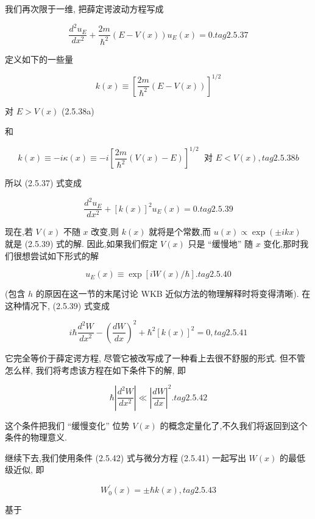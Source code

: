 \documentclass[lang=cn,newtx,10pt,scheme=chinese,thmcnt=section]{elegantbook}
\begin{document}
我们再次限于一维, 把薛定谔波动方程写成

$$
\frac{{d}^{2}{u}_{E}}{d{x}^{2}} + \frac{2m}{{\hbar }^{2}}\left( {E - V\left( x\right) }\right) {u}_{E}\left( x\right) = 0. tag{2.5.37}
$$

定义如下的一些量

$$
k\left( x\right) \equiv {\left\lbrack \frac{2m}{{\hbar }^{2}}\left( E - V\left( x\right) \right) \right\rbrack }^{1/2}
$$

对 $E > V\left( x\right)$ (2.5.38a)

和

$$
k\left( x\right) \equiv - {i\kappa }\left( x\right) \equiv - i{\left\lbrack \frac{2m}{{\hbar }^{2}}\left( V\left( x\right) - E\right) \right\rbrack }^{1/2}\;\text{ 对 }E < V\left( x\right) , tag{2. 5.38b}
$$

所以 (2.5.37) 式变成

$$
\frac{{d}^{2}{u}_{E}}{d{x}^{2}} + {\left\lbrack k\left( x\right) \right\rbrack }^{2}{u}_{E}\left( x\right) = 0. tag{2.5.39}
$$

现在,若 $V\left( x\right)$ 不随 $x$ 改变,则 $k\left( x\right)$ 就将是个常数,而 $u\left( x\right) \propto \exp \left( {\pm {ikx}}\right)$ 就是 (2.5.39) 式的解. 因此,如果我们假定 $V\left( x\right)$ 只是 “缓慢地” 随 $x$ 变化,那时我们很想尝试如下形式的解

$$
{u}_{E}\left( x\right) \equiv \exp \left\lbrack {{iW}\left( x\right) /\hbar }\right\rbrack . tag{2.5.40}
$$

(包含 $h$ 的原因在这一节的末尾讨论 WKB 近似方法的物理解释时将变得清晰). 在这种情况下, (2.5.39) 式变成

$$
i\hbar \frac{{d}^{2}W}{d{x}^{2}} - {\left( \frac{dW}{dx}\right) }^{2} + {\hbar }^{2}{\left\lbrack k\left( x\right) \right\rbrack }^{2} = 0, tag{2.5.41}
$$

它完全等价于薛定谔方程, 尽管它被改写成了一种看上去很不舒服的形式. 但不管怎么样, 我们将考虑该方程在如下条件下的解, 即

$$
\hbar \left| \frac{{d}^{2}W}{d{x}^{2}}\right| \ll {\left| \frac{dW}{dx}\right| }^{2}. tag{2.5.42}
$$

这个条件把我们 “缓慢变化” 位势 $V\left( x\right)$ 的概念定量化了,不久我们将返回到这个条件的物理意义.

继续下去,我们使用条件 (2.5.42) 式与微分方程 (2.5.41) 一起写出 $W\left( x\right)$ 的最低级近似, 即

$$
{W}_{0}^{\prime }\left( x\right) = \pm \hbar k\left( x\right) , tag{2.5.43}
$$

基于
\end{document}

